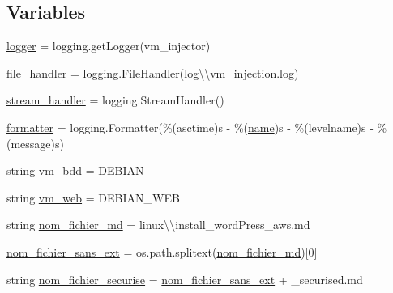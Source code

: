 \subsection*{Variables}
\begin{DoxyCompactItemize}
\item 
\hyperlink{namespacegestion__password__fichiers__md_a5bda7dd446ba2c1b82cb5ea99a40801e}{logger} = logging.\+get\+Logger(\textquotesingle{}vm\+\_\+injector\textquotesingle{})
\item 
\hyperlink{namespacegestion__password__fichiers__md_ad84745acf19f3a6f8ba36ee50eb80050}{file\+\_\+handler} = logging.\+File\+Handler(\textquotesingle{}log\textbackslash{}\textbackslash{}vm\+\_\+injection.\+log\textquotesingle{})
\item 
\hyperlink{namespacegestion__password__fichiers__md_aabd29b509d5ccd4932a45ce5afe7222c}{stream\+\_\+handler} = logging.\+Stream\+Handler()
\item 
\hyperlink{namespacegestion__password__fichiers__md_a4a562b60fca0d2428c01fc5a209ef709}{formatter} = logging.\+Formatter(\textquotesingle{}\%(asctime)s -\/ \%(\hyperlink{NetBSDMachine_8c_a8f8f80d37794cde9472343e4487ba3eb}{name})s -\/ \%(levelname)s -\/ \%(message)s\textquotesingle{})
\item 
string \hyperlink{namespacegestion__password__fichiers__md_acecca222355eea5defc9856a06e54aad}{vm\+\_\+bdd} = \textquotesingle{}D\+E\+B\+I\+AN\textquotesingle{}
\item 
string \hyperlink{namespacegestion__password__fichiers__md_a6a3649be551fee6548728339c1bc8e7d}{vm\+\_\+web} = \textquotesingle{}D\+E\+B\+I\+A\+N\+\_\+\+W\+EB\textquotesingle{}
\item 
string \hyperlink{namespacegestion__password__fichiers__md_a5c7a15a2d59a9131b0e1be980d79eb93}{nom\+\_\+fichier\+\_\+md} = \textquotesingle{}linux\textbackslash{}\textbackslash{}install\+\_\+word\+Press\+\_\+aws.\+md\textquotesingle{}
\item 
\hyperlink{namespacegestion__password__fichiers__md_a883ad9cea0eaddfcfe3b4abed529f02f}{nom\+\_\+fichier\+\_\+sans\+\_\+ext} = os.\+path.\+splitext(\hyperlink{namespacegestion__password__fichiers__md_a5c7a15a2d59a9131b0e1be980d79eb93}{nom\+\_\+fichier\+\_\+md})\mbox{[}0\mbox{]}
\item 
string \hyperlink{namespacegestion__password__fichiers__md_ae66c7cf0e6a2098bb75ab3fb5641e09d}{nom\+\_\+fichier\+\_\+securise} = \hyperlink{namespacegestion__password__fichiers__md_a883ad9cea0eaddfcfe3b4abed529f02f}{nom\+\_\+fichier\+\_\+sans\+\_\+ext} + \textquotesingle{}\+\_\+securised.\+md\textquotesingle{}
\end{DoxyCompactItemize}


